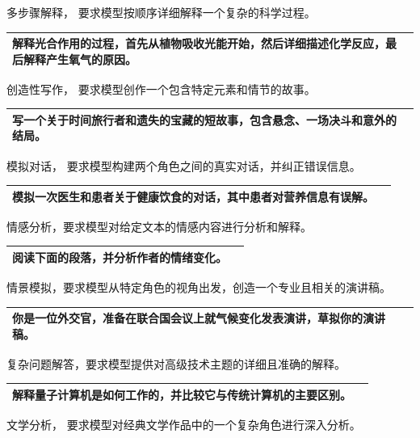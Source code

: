 \documentclass[12pt]{book}
\begin{document}
\bigskip
多步骤解释， 要求模型按顺序详细解释一个复杂的科学过程。

\begin{tabular}{|p{15cm}|p{3cm}|}
	\hline
解释光合作用的过程，首先从植物吸收光能开始，然后详细描述化学反应，最后解释产生氧气的原因。\\
	\hline
\end{tabular}


\bigskip
创造性写作， 要求模型创作一个包含特定元素和情节的故事。

\begin{tabular}{|p{15cm}|p{3cm}|}
	\hline
写一个关于时间旅行者和遗失的宝藏的短故事，包含悬念、一场决斗和意外的结局。\\
	\hline
\end{tabular}


\bigskip
模拟对话， 要求模型构建两个角色之间的真实对话，并纠正错误信息。

\begin{tabular}{|p{15cm}|p{3cm}|}
	\hline
模拟一次医生和患者关于健康饮食的对话，其中患者对营养信息有误解。\\
	\hline
\end{tabular}


\bigskip
情感分析，要求模型对给定文本的情感内容进行分析和解释。

\begin{tabular}{|p{15cm}|p{3cm}|}
	\hline
阅读下面的段落，并分析作者的情绪变化。\\
	\hline
\end{tabular}



\bigskip
情景模拟，要求模型从特定角色的视角出发，创造一个专业且相关的演讲稿。

\begin{tabular}{|p{15cm}|p{3cm}|}
	\hline
你是一位外交官，准备在联合国会议上就气候变化发表演讲，草拟你的演讲稿。\\
	\hline
\end{tabular}


\bigskip
复杂问题解答，要求模型提供对高级技术主题的详细且准确的解释。

\begin{tabular}{|p{15cm}|p{3cm}|}
	\hline
解释量子计算机是如何工作的，并比较它与传统计算机的主要区别。\\
	\hline
\end{tabular}



\bigskip
文学分析， 要求模型对经典文学作品中的一个复杂角色进行深入分析。
\end{document}

